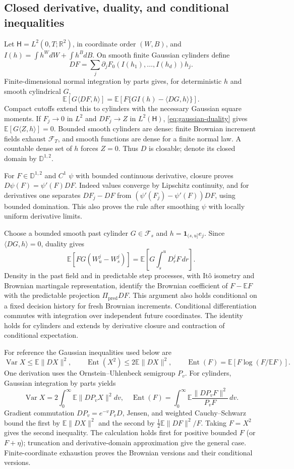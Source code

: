 \documentclass[11pt,a4paper]{amsart}
\theoremstyle{plain}
\theoremstyle{definition}
\theoremstyle{remark}
\DeclareMathOperator{\Var}{Var}
\newcommand{\R}{\mathbb{R}}
\newcommand{\EE}{\mathbb{E}}
\newcommand{\F}{\mathcal F}
\newcommand{\Ent}{\operatorname{Ent}}
\begin{document}
\subsection{Closed derivative, duality, and conditional inequalities}
Let $\mathsf H=L^2(0,T;\R^2)$, in coordinate order $(W,B)$, and $I(h)=\int h^W dW+\int h^B dB$. On smooth finite Gaussian cylinders define
\[
 D F=\sum_j\partial_jF_0(I(h_1),\ldots,I(h_d))h_j.
\]
Finite-dimensional normal integration by parts gives, for deterministic $h$ and smooth cylindrical $G$,
\begin{equation}\label{eq:gaussian-duality}
 \EE[G\langle DF,h\rangle]=
 \EE[F\{GI(h)-\langle DG,h\rangle\}].
\end{equation}
Compact cutoffs extend this to cylinders with the necessary Gaussian square moments. If $F_j\to0$ in $L^2$ and $DF_j\to Z$ in $L^2(\mathsf H)$, \eqref{eq:gaussian-duality} gives $\EE[G\langle Z,h\rangle]=0$. Bounded smooth cylinders are dense: finite Brownian increment fields exhaust $\F_T$, and smooth functions are dense for a finite normal law. A countable dense set of $h$ forces $Z=0$. Thus $D$ is closable; denote its closed domain by $\mathbb D^{1,2}$.

For $F\in\mathbb D^{1,2}$ and $C^1$ $\psi$ with bounded continuous derivative, closure proves $D\psi(F)=\psi'(F)DF$. Indeed values converge by Lipschitz continuity, and for derivatives one separates $DF_j-DF$ from $(\psi'(F_j)-\psi'(F))DF$, using bounded domination. This also proves the rule after smoothing $\psi$ with locally uniform derivative limits.

Choose a bounded smooth past cylinder $G\in\F_s$ and $h=\mathbf1_{(s,u]}e_j$. Since $\langle DG,h\rangle=0$, duality gives
\[
 \EE[FG(W_u^j-W_s^j)]=\EE\left[G\int_s^u D_r^jF\,dr\right].
\]
Density in the past field and in predictable step processes, with It\^o isometry and Brownian martingale representation, identify the Brownian coefficient of $F-\EE F$ with the predictable projection $\Pi_{\mathrm{pred}}DF$. This argument also holds conditional on a fixed decision history for fresh Brownian increments. Conditional differentiation commutes with integration over independent future coordinates. The identity holds for cylinders and extends by derivative closure and contraction of conditional expectation.

For reference the Gaussian inequalities used below are
\begin{equation}\label{eq:gaussian-inequalities}
 \Var X\le\EE\|DX\|^2,\qquad
 \Ent(X^2)\le2\EE\|DX\|^2,
 \qquad \Ent(F)=\EE[F\log(F/\EE F)].
\end{equation}
One derivation uses the Ornstein--Uhlenbeck semigroup $P_v$. For cylinders, Gaussian integration by parts yields
\[
 \Var X=2\int_0^\infty\EE\|DP_vX\|^2dv,
 \quad
 \Ent(F)=\int_0^\infty\EE\frac{\|DP_vF\|^2}{P_vF}\,dv.
\]
Gradient commutation $DP_v=e^{-v}P_vD$, Jensen, and weighted Cauchy--Schwarz bound the first by $\EE\|DX\|^2$ and the second by $\tfrac12\EE\|DF\|^2/F$. Taking $F=X^2$ gives the second inequality. The calculation holds first for positive bounded $F$ (or $F+\eta$); truncation and derivative-domain approximation give the general case. Finite-coordinate exhaustion proves the Brownian versions and their conditional versions.
\end{document}
